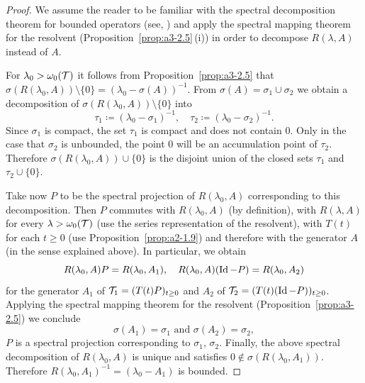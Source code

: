 \begin{proof}
We assume the reader to be familiar with the spectral decomposition theorem for bounded operators (see, \eg \textcite[p.572]{dunfordschwartz:1958}) and apply the spectral mapping theorem for the resolvent (Proposition~\ref{prop:a3-2.5}\,(i)) in order to decompose $R(\lambda,A)$ instead of\/ $A$.

For $\lambda_{0} > \omega_{0}(\mathcal{T})$ it follows from Proposition~\ref{prop:a3-2.5} that $\sigma(R(\lambda_{0},A)) \setminus \{0\} = (\lambda_{0} - \sigma(A))^{-1}$.
From $\sigma(A) = \sigma_{1} \cup \sigma_{2}$ we obtain a decomposition of\/ $\sigma(R(\lambda_{0},A)) \setminus \{0\}$ into
\[
	\tau_{1} \coloneq (\lambda_{0} - \sigma_{1})^{-1}, 
		\quad 
	\tau_{2} \coloneq (\lambda_{0} - \sigma_{2})^{-1} .
\]
Since $\sigma_{1}$ is compact, the set $\tau_{1}$ is compact and does not contain $0$.
Only in the case that $\sigma_{2}$ is unbounded, the point $0$ will be an accumulation point of\/ $\tau_{2}$.
Therefore $\sigma(R(\lambda_{0},A)) \cup \{0\}$ is the disjoint union of the closed sets $\tau_{1}$ and $\tau_{2} \cup \{0\}$.

Take now $P$ to be the spectral projection of\/ $R(\lambda_{0},A)$ corresponding to this decomposition.
Then $P$ commutes with $R(\lambda_{0},A)$ (by definition), with $R(\lambda,A)$ for every $\lambda > \omega_{0}(\mathcal{T})$ (use the series representation of the resolvent), with $T(t)$ for each $t \geq 0$ (use Proposition~\ref{prop:a2-1.9}) and therefore with the generator $A$ (in the sense explained above).
In particular, we obtain
\begin{equation*}\label{eq:a3-new}
R(\lambda_{0},A)P = R(\lambda_{0},A_{1}), \quad R(\lambda_{0},A)(\operatorname{Id}-P) = R(\lambda_{0},A_{2})
\end{equation*}
for the generator $A_{1}$ of\/ $\TT_{1} = (T(t)P)_{t \geq 0}$ and $A_{2}$ of\/ $\TT_{2} = (T(t)(\Id-P))_{t \geq 0}$.
Applying the spectral mapping theorem for the resolvent (Proposition~\ref{prop:a3-2.5})
we conclude
\[
\sigma(A_{1}) = \sigma_{1} \text{ and } \sigma(A_{2}) = \sigma_{2} ,
\]
\ie $P$ is a spectral projection corresponding to $\sigma_{1}$, $\sigma_{2}$.
Finally, the above spectral decomposition of\/ $R(\lambda_{0},A)$ is unique and satisfies $0 \notin \sigma(R(\lambda_{0},A_{1}))$.
Therefore $R(\lambda_{0},A_{1})^{-1} = (\lambda_{0}-A_{1})$ is bounded.
\end{proof}
